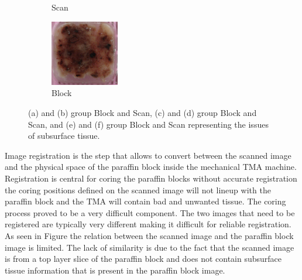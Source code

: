 \documentclass[a4paper,10pt,oneside]{article}
\begin{document}
\begin{figure}[hbtp]
\begin{subfigure}[b]{.2\textwidth}
    \caption{Scan}
  \end{subfigure}
  \begin{subfigure}[b]{.2\textwidth}
	  \includegraphics[width=3cm]{images/PO14004821_B3.JPG} 
    \caption{Block}
  \end{subfigure}
	\caption{(a) and (b) group Block and Scan, (c) and (d) group Block and Scan, and (e) and (f) group Block and Scan representing the issues of subsurface tissue.}
	\label{fig:subsurface}
\end{figure}
Image registration is the step that allows to convert between the scanned image and the physical space of the paraffin block inside the mechanical TMA machine. Registration is central for coring the paraffin blocks without accurate registration the coring positions defined on the scanned image will not lineup with the paraffin block and the TMA will contain bad and unwanted tissue. The coring process proved to be a very difficult component. The two images that need to be registered are typically very different making it difficult for reliable registration. As seen in Figure the relation between the scanned image and the paraffin block image is limited. The lack of similarity is due to the fact that the scanned image is from a top layer slice of the paraffin block and does not contain subsurface tissue information that is present in the paraffin block image.
\end{document}
